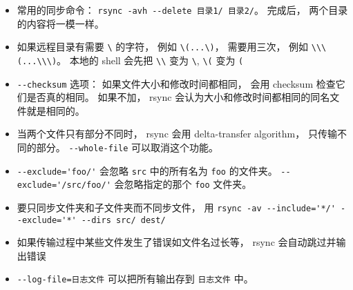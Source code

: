 \begin{itemize}
\item 常用的同步命令： \verb`rsync -avh --delete 目录1/ 目录2/`。 完成后， 两个目录的内容将一模一样。
\item 如果远程目录有需要 \verb`\` 的字符， 例如 \verb`\(...\)`， 需要用三次， 例如 \verb`\\\(...\\\)`。 本地的 shell 会先把 \verb`\\` 变为 \verb`\`, \verb`\(` 变为 \verb`(`
\item \verb`--checksum` 选项： 如果文件大小和修改时间都相同， 会用 checksum 检查它们是否真的相同。 如果不加， rsync 会认为大小和修改时间都相同的同名文件就是相同的。
\item 当两个文件只有部分不同时， rsync 会用 delta-transfer algorithm， 只传输不同的部分。 \verb`--whole-file` 可以取消这个功能。
\item \verb`--exclude='foo/'` 会忽略 \verb`src` 中的所有名为 \verb`foo` 的文件夹。 \verb`--exclude='/src/foo/'` 会忽略指定的那个 \verb`foo` 文件夹。
\item 要只同步文件夹和子文件夹而不同步文件， 用 \verb`rsync -av --include='*/' --exclude='*' --dirs src/ dest/`
\item 如果传输过程中某些文件发生了错误如文件名过长等， rsync 会自动跳过并输出错误
\item \verb`--log-file=日志文件` 可以把所有输出存到 \verb`日志文件` 中。
\end{itemize}

